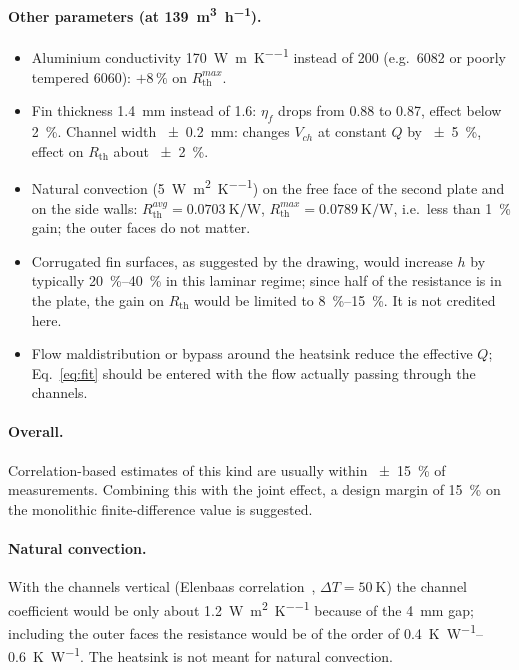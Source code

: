 \documentclass[11pt,a4paper]{article}
\newcommand{\Rth}{R_{\mathrm{th}}}
\begin{document}
\paragraph{Other parameters (at \SI{139}{\cubic\metre\per\hour}).}
\begin{itemize}
\item Aluminium conductivity \SI{170}{\watt\per\metre\per\kelvin} instead of 200 (e.g.\ 6082 or poorly tempered 6060): $+8\,\%$ on $\Rth^{max}$.
\item Fin thickness \SI{1.4}{\milli\metre} instead of 1.6: $\eta_f$ drops from 0.88 to 0.87, effect below \SI{2}{\percent}. Channel width \SI{\pm 0.2}{\milli\metre}: changes $V_{ch}$ at constant $Q$ by \SI{\pm 5}{\percent}, effect on $\Rth$ about \SI{\pm 2}{\percent}.
\item Natural convection (\SI{5}{\watt\per\metre\squared\per\kelvin}) on the free face of the second plate and on the side walls: $\Rth^{avg}=\SI{0.0703}{\kelvin\per\watt}$, $\Rth^{max}=\SI{0.0789}{\kelvin\per\watt}$, i.e.\ less than \SI{1}{\percent} gain; the outer faces do not matter.
\item Corrugated fin surfaces, as suggested by the drawing, would increase $h$ by typically \SIrange{20}{40}{\percent} in this laminar regime; since half of the resistance is in the plate, the gain on $\Rth$ would be limited to \SIrange{8}{15}{\percent}. It is not credited here.
\item Flow maldistribution or bypass around the heatsink reduce the effective $Q$; Eq.~\eqref{eq:fit} should be entered with the flow actually passing through the channels.
\end{itemize}

\paragraph{Overall.} Correlation-based estimates of this kind are usually within \SI{\pm 15}{\percent} of measurements. Combining this with the joint effect, a design margin of \SI{15}{\percent} on the monolithic finite-difference value is suggested.

\paragraph{Natural convection.} With the channels vertical (Elenbaas correlation~\cite{elenbaas1942}, $\Delta T=\SI{50}{\kelvin}$) the channel coefficient would be only about \SI{1.2}{\watt\per\metre\squared\per\kelvin} because of the \SI{4}{\milli\metre} gap; including the outer faces the resistance would be of the order of \SIrange{0.4}{0.6}{\kelvin\per\watt}. The heatsink is not meant for natural convection.
\end{document}
